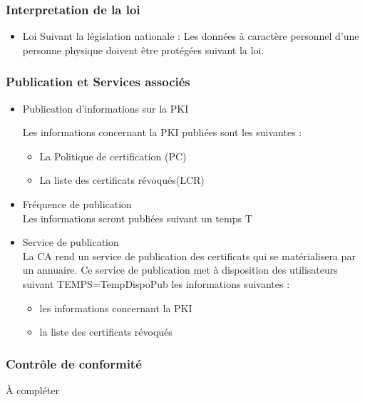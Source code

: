 \documentclass[a4paper,11pt,french]{book}
\begin{document}
\subsubsection{Interpretation de la loi}
\begin{itemize}
\item Loi
Suivant la législation nationale :
Les données à caractère personnel d’une personne physique doivent être protégées suivant la loi.

\end{itemize}

\subsubsection{Publication et Services associés}
\begin{itemize}

\item Publication d’informations sur la PKI

Les informations concernant la PKI publiées sont les suivantes :
\begin{itemize}
\item La Politique de certification (PC)
\item La liste des certificats révoqués(LCR)
\end{itemize}

\item Fréquence de publication
\\Les informations seront publiées suivant un temps T

\item Service de publication
\\La CA rend un service de publication des certificats qui se matérialisera par un annuaire. Ce service de publication met à disposition des utilisateurs suivant TEMPS=TempDispoPub les informations suivantes :
\begin{itemize}
\item les informations concernant la PKI
\item la liste des certificats révoqués
\end{itemize}

\end{itemize}

\subsubsection{Contrôle de conformité}
À compléter
\end{document}
